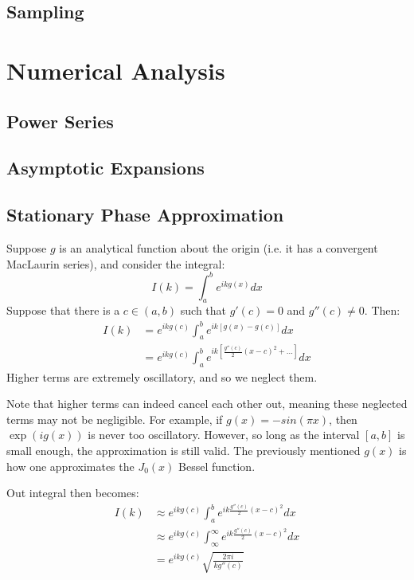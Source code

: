 \documentclass[crop=false,class=book,oneside]{standalone}
\begin{document}
        \subsection{Sampling}
    \section{Numerical Analysis}
        \subsection{Power Series}
        \subsection{Asymptotic Expansions}
        \subsection{Stationary Phase Approximation}
            Suppose $g$ is an analytical function about
            the origin (i.e. it has a convergent MacLaurin series),
            and consider the integral:
            \begin{equation}
                I(k) = \int_{a}^{b}e^{ikg(x)}dx
            \end{equation}
            Suppose that there is a $c\in(a,b)$ such
            that $g'(c)=0$ and $g''(c)\ne 0$. Then:
            \begin{align}
                \nonumber I(k)&=e^{ikg(c)}\int_{a}^{b}e^{ik[g(x)-g(c)]}dx\\
                &=e^{ikg(c)}\int_{a}^{b}e^{ik[\frac{g''(c)}{2}(x-c)^{2}+\hdots]}dx
            \end{align}
            Higher terms are extremely oscillatory, and so we neglect them.
            \begin{remark}
                Note that higher terms can indeed cancel each
                other out, meaning these neglected terms may
                not be negligible. For example, if
                $g(x)=-sin(\pi x)$, then $\exp(ig(x))$ is never
                too oscillatory. However, so long as the interval
                $[a,b]$ is small enough, the approximation is still
                valid. The previously mentioned $g(x)$ is how
                one approximates the $J_{0}(x)$ Bessel function.
            \end{remark}
            Out integral then becomes:
            \begin{align}
                I(k)&\approx e^{ikg(c)}\int_{a}^{b}e^{ik\frac{g''(c)}{2}(x-c)^{2}}dx\\
                &\approx e^{ikg(c)}\int_{\infty}^{\infty}e^{ik\frac{g''(c)}{2}(x-c)^{2}}dx\\
                &=e^{ikg(c)}\sqrt{\frac{2\pi i}{kg''(c)}}
            \end{align}
\end{document}
